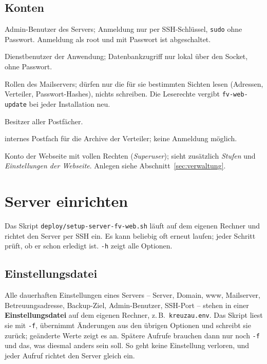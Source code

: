 \documentclass[a4paper,fontsize=10pt]{scrartcl}
\newcommand*{\cmd}[1]{\texttt{#1}}
\newcommand*{\pfad}[1]{\texttt{#1}}
\begin{document}
\subsection{Konten}

\begin{description}[style=nextline,leftmargin=0pt,itemsep=0.3\baselineskip]
  \item[\cmd{fkjs} (Linux)] Admin-Benutzer des Servers; Anmeldung nur per SSH-Schlüssel,
    \cmd{sudo} ohne Passwort. Anmeldung als root und mit Passwort ist abgeschaltet.
  \item[\cmd{fvweb} (Linux und PostgreSQL)] Dienstbenutzer der Anwendung; Datenbankzugriff
    nur lokal über den Socket, ohne Passwort.
  \item[\cmd{dovecot}, \cmd{Debian-exim} (PostgreSQL)] Rollen des Mailservers; dürfen nur
    die für sie bestimmten Sichten lesen (Adressen, Verteiler, Passwort-Hashes), nichts
    schreiben. Die Leserechte vergibt \cmd{fv-web-update} bei jeder Installation neu.
  \item[\cmd{vmail} (Linux)] Besitzer aller Postfächer.
  \item[\cmd{fv-archiv@<domain>}] internes Postfach für die Archive der Verteiler; keine
    Anmeldung möglich.
  \item[Administrator der Webseite] Konto der Webseite mit vollen Rechten
    (\emph{Superuser}); sieht zusätzlich \emph{Stufen} und \emph{Einstellungen der
    Webseite}. Anlegen siehe Abschnitt~\ref{sec:verwaltung}.
\end{description}

\section{Server einrichten}\label{sec:einrichten}

Das Skript \pfad{deploy/setup-server-fv-web.sh} läuft auf dem eigenen Rechner und
richtet den Server per SSH ein. Es kann beliebig oft erneut laufen; jeder Schritt
prüft, ob er schon erledigt ist. \cmd{-h} zeigt alle Optionen.

\subsection{Einstellungsdatei}\label{sec:einstellungsdatei}

Alle dauerhaften Einstellungen eines Servers -- Server, Domain, www, Mailserver,
Betreuungsadresse, Backup-Ziel, Admin-Benutzer, SSH-Port -- stehen in einer
\textbf{Einstellungsdatei} auf dem eigenen Rechner, z.\,B.\ \pfad{kreuzau.env}. Das
Skript liest sie mit \cmd{-f}, übernimmt Änderungen aus den übrigen Optionen und
schreibt sie zurück; geänderte Werte zeigt es an. Spätere Aufrufe brauchen dann nur
noch \cmd{-f} und das, was diesmal anders sein soll. So geht keine Einstellung
verloren, und jeder Aufruf richtet den Server gleich ein.
\end{document}
